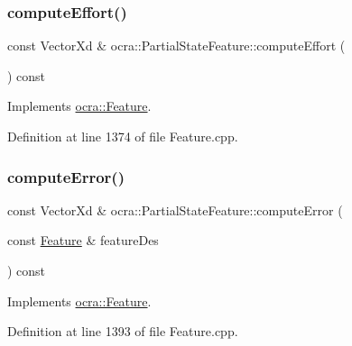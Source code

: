 \subsubsection{\texorpdfstring{compute\+Effort()}{computeEffort()}\hspace{0.1cm}{\footnotesize\ttfamily [2/2]}}
{\footnotesize\ttfamily const Vector\+Xd \& ocra\+::\+Partial\+State\+Feature\+::compute\+Effort (\begin{DoxyParamCaption}{ }\end{DoxyParamCaption}) const\hspace{0.3cm}{\ttfamily [virtual]}}



Implements \hyperlink{classocra_1_1Feature_ae43f2ffc54862d6ddc0b02fd39431eb6}{ocra\+::\+Feature}.



Definition at line 1374 of file Feature.\+cpp.

\hypertarget{classocra_1_1PartialStateFeature_af109d0d3c367db31f45f46fcc7c669c8}{}\label{classocra_1_1PartialStateFeature_af109d0d3c367db31f45f46fcc7c669c8} 
\subsubsection{\texorpdfstring{compute\+Error()}{computeError()}\hspace{0.1cm}{\footnotesize\ttfamily [1/2]}}
{\footnotesize\ttfamily const Vector\+Xd \& ocra\+::\+Partial\+State\+Feature\+::compute\+Error (\begin{DoxyParamCaption}\item[{const \hyperlink{classocra_1_1Feature}{Feature} \&}]{feature\+Des }\end{DoxyParamCaption}) const\hspace{0.3cm}{\ttfamily [virtual]}}



Implements \hyperlink{classocra_1_1Feature_aaa74d6869f7e574fcc39d443581ddf77}{ocra\+::\+Feature}.



Definition at line 1393 of file Feature.\+cpp.

\hypertarget{classocra_1_1PartialStateFeature_a7d412f45a1ae3ce72a82cee84cdddc7e}{}\label{classocra_1_1PartialStateFeature_a7d412f45a1ae3ce72a82cee84cdddc7e} 
